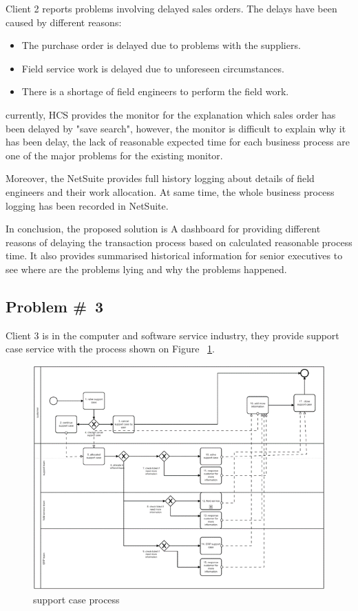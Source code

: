 Client 2  reports problems involving delayed sales orders. The delays have been caused by different reasons:
\begin{itemize}
    \item The purchase order is delayed due to problems with the suppliers.
    \item Field service work is delayed due to unforeseen circumstances.
    \item There is a shortage of field engineers to perform the field work.
\end{itemize}

currently, HCS provides the monitor for the explanation which sales order has been delayed by "save search", however, the monitor is difficult to explain why it has been delay, the lack of reasonable expected time for each business process are one of the major problems for the existing monitor. 

Moreover, the NetSuite provides full history logging about details of field engineers and their work allocation. At same time, the whole business process logging has been recorded in NetSuite.

In conclusion, the proposed solution is A dashboard for providing different reasons of delaying the transaction process based on calculated reasonable process time. It also provides summarised historical information for senior executives to see where are the problems lying and why the problems happened. 

\subsection{Problem \#~3}

Client 3 is in the computer and software service industry, they provide support case service with the process shown on Figure ~\ref{figure:supportCase}.
\begin{figure}[!htb]
    \centering 
    \includegraphics[scale=0.7]{resource/supportCase.png}
    \caption{support case process}
    \label{figure:supportCase}
\end{figure}

